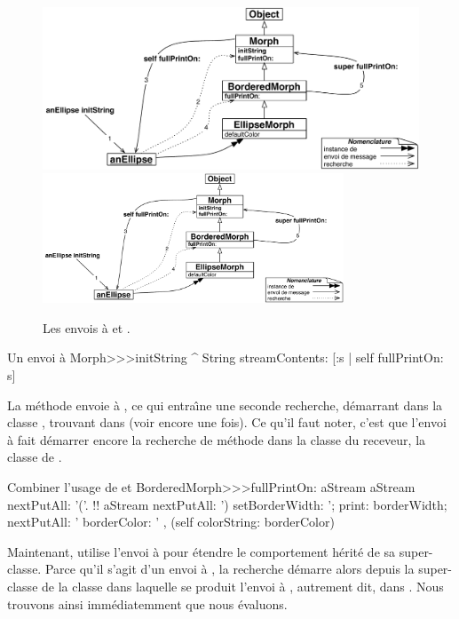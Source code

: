 \documentclass[a4paper,10pt,twoside]{book}
\begin{document}
\begin{figure}[htb]
\begin{center}
\ifluluelse
	{\includegraphics[width=\textwidth]{initStringLookup}}
	{\includegraphics[width=0.8\textwidth]{initStringLookup}}
\caption{Les envois \`a \self et \super.\label{fig:initStringLookup}}
\end{center}
\end{figure}

\begin{method}[initString]{Un envoi \`a \self}
Morph>>>initString
	^ String streamContents: [:s | self fullPrintOn: s]
\end{method}
La m\'ethode  envoie  \`a \self,
ce qui entra\^{\i}ne une seconde recherche, d\'emarrant dans la classe
, trouvant  dans  (voir  encore une fois).
Ce qu'il faut noter, c'est que l'envoi \`a \self
fait d\'emarrer encore la recherche de m\'ethode dans la classe du 
receveur, \ie la classe de
.


\begin{method}[fullPrintOn]{Combiner l'usage de \super et \self}
BorderedMorph>>>fullPrintOn: aStream
	aStream nextPutAll: '('.
	!!
	aStream nextPutAll: ') setBorderWidth: '; print: borderWidth;
		nextPutAll: ' borderColor: ' , (self colorString: borderColor)
\end{method}
Maintenant,  utilise l'envoi \`a \super pour \'etendre le comportement  h\'erit\'e de sa super-classe.
Parce qu'il s'agit d'un envoi \`a \super, la recherche d\'emarre alors
depuis la super-classe de la classe dans laquelle se produit l'envoi \`a
\super, autrement dit, dans 
.
Nous trouvons ainsi imm\'ediatemment  que nous \'evaluons.
\end{document}

